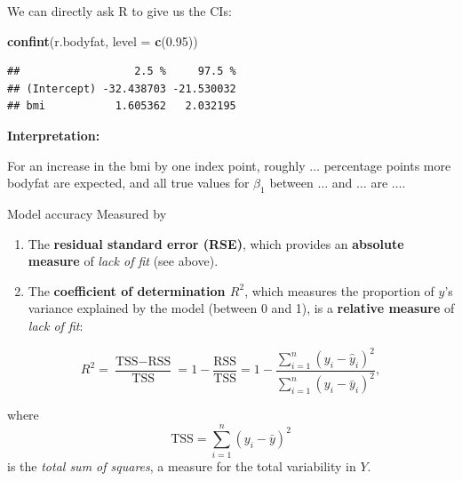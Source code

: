 \documentclass[
  10pt,
  ignorenonframetext,
]{beamer}
\newenvironment{Shaded}{\begin{snugshade}}{\end{snugshade}}
\newcommand{\AttributeTok}[1]{\textcolor[rgb]{0.13,0.29,0.53}{#1}}
\newcommand{\FloatTok}[1]{\textcolor[rgb]{0.00,0.00,0.81}{#1}}
\newcommand{\FunctionTok}[1]{\textcolor[rgb]{0.13,0.29,0.53}{\textbf{#1}}}
\newcommand{\NormalTok}[1]{#1}
\providecommand{\tightlist}{%
  \setlength{\itemsep}{0pt}\setlength{\parskip}{0pt}}
\begin{document}
\begin{frame}[fragile]
We can directly ask R to give us the CIs:

\vspace{4mm}

\scriptsize

\begin{Shaded}
\begin{Highlighting}[]
\FunctionTok{confint}\NormalTok{(r.bodyfat, }\AttributeTok{level =} \FunctionTok{c}\NormalTok{(}\FloatTok{0.95}\NormalTok{))}
\end{Highlighting}
\end{Shaded}

\begin{verbatim}
##                  2.5 %     97.5 %
## (Intercept) -32.438703 -21.530032
## bmi           1.605362   2.032195
\end{verbatim}

\vspace{4mm}

\normalsize

\textbf{Interpretation:}

For an increase in the bmi by one index point, roughly \(\ldots\)
percentage points more bodyfat are expected, and all true values for
\(\beta_1\) between \(\ldots\) and \(\ldots\) are \(\ldots\).
\end{frame}

\begin{frame}{Model accuracy}
\protect\hypertarget{model-accuracy}{}
Measured by

\begin{enumerate}
\tightlist
\item
  The \textbf{residual standard error (RSE)}, which provides an
  \textbf{absolute measure} of \emph{lack of fit} (see above).
\end{enumerate}

\vspace{2mm}

\begin{enumerate}
\setcounter{enumi}{1}
\tightlist
\item
  The \textbf{coefficient of determination \(R^2\)}, which measures the
  proportion of \(y\)'s variance explained by the model (between 0 and
  1), is a \textbf{relative measure} of \emph{lack of fit}:
\end{enumerate}

\[R^2 = \frac{\text{TSS}-\text{RSS}}{\text{TSS}}= 1-\frac{\text{RSS}}{\text{TSS}}=1-\frac{\sum_{i=1}^n(y_i-\hat{y}_i)^2}{\sum_{i=1}^n(y_i-\bar{y}_i)^2}, \]

where \[\text{TSS} = \sum_{i=1}^n (y_i - \bar{y})^2\] is the \emph{total
sum of squares}, a measure for the total variability in \(Y\).
\end{frame}
\end{document}
